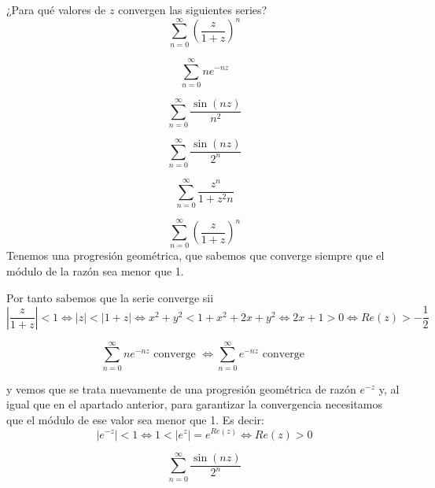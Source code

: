 \begin{problem}[18]
¿Para qué valores de $z$ convergen las siguientes series?
\ppart
\[\sum_{n=0}^{\infty} \left( \frac{z}{1+z}\right)^n\]

\ppart
\[\sum_{n=0}^{\infty} ne^{-nz}\]

\ppart
\[\sum_{n=0}^{\infty} \frac{\sin(nz)}{n^2}\]

\ppart
\[\sum_{n=0}^{\infty} \frac{\sin(nz)}{2^n}\]

\ppart
\[\sum_{n=0}^{\infty} \frac{z^n}{1+z^2n}\]

\solution

\spart
\[\sum_{n=0}^{\infty} \left( \frac{z}{1+z}\right)^n\]
Tenemos una progresión geométrica, que sabemos que converge siempre que el módulo de la razón sea menor que 1.

Por tanto sabemos que la serie converge sii
\[\left| \frac{z}{1+z}\right| < 1 \iff |z| < |1+z| \iff x^2+y^2 < 1+x^2+2x+y^2 \iff 2x+1 > 0 \iff Re(z)>-\frac{1}{2}\]

\spart
\[\sum_{n=0}^{\infty} ne^{-nz} \text{ converge } \iff \sum_{n=0}^{\infty} e^{-nz}\text{ converge }\]

y vemos que se trata nuevamente de una progresión geométrica de razón $e^{-z}$ y, al igual que en el apartado anterior, para garantizar la convergencia necesitamos que el módulo de ese valor sea menor que 1. Es decir:
\[|e^{-z}| < 1 \iff 1 < |e^z|=e^{Re(z)} \iff Re(z) > 0\]

\spart
\[\sum_{n=0}^{\infty} \frac{\sin(nz)}{2^n}\]
\spart

\spart

\end{problem}

